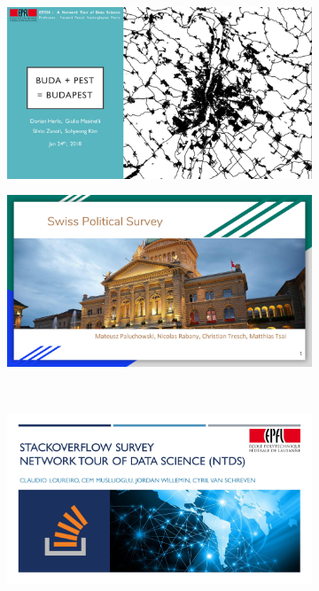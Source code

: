 \documentclass[aspectratio=169]{beamer}
\begin{document}
\begin{frame}
\begin{figure}
\begin{subfigure}[b]{0.24\linewidth}
		\end{subfigure}
		\hfill
		\begin{subfigure}[b]{0.24\linewidth}
			\includegraphics[width=\linewidth]{project2017_roads}
		\end{subfigure}
		\hfill
		\begin{subfigure}[b]{0.24\linewidth}
			\includegraphics[width=\linewidth]{project2017_politics}
		\end{subfigure}
		\\
		\vspace{2em}
		\begin{subfigure}[b]{0.24\linewidth}
			\includegraphics[width=\linewidth]{project2017_stackoverflow}

\end{subfigure}
\end{figure}
\end{frame}
\end{document}

